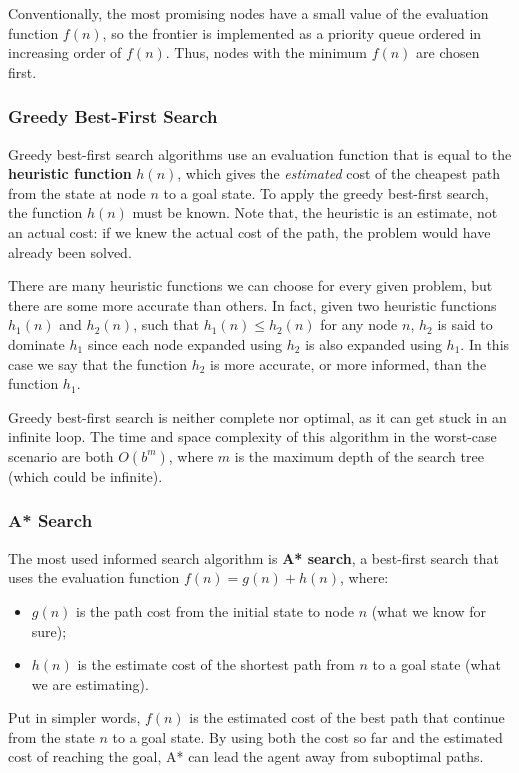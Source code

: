 \documentclass{article}
\begin{document}
Conventionally, the most promising nodes have a small value of the evaluation function \(f(n)\), so the frontier is implemented as a priority queue ordered in increasing order of \(f(n)\). Thus, nodes with the minimum \(f(n)\) are chosen first.

\subsubsection{Greedy Best-First Search}
Greedy best-first search algorithms use an evaluation function that is equal to the \textbf{heuristic function} \(h(n)\), which gives the \textit{estimated} cost of the cheapest path from the state at node \(n\) to a goal state. To apply the greedy best-first search, the function \(h(n)\) must be known. Note that, the heuristic is an estimate, not an actual cost: if we knew the actual cost of the path, the problem would have already been solved.

There are many heuristic functions we can choose for every given problem, but there are some more accurate than others. In fact, given two heuristic functions \(h_1(n)\) and \(h_2(n)\), such that \(h_1(n)\le h_2(n)\) for any node \(n\), \(h_2\) is said to dominate \(h_1\) since each node expanded using \(h_2\) is also expanded using \(h_1\). In this case we say that the function \(h_2\) is more accurate, or more informed, than the function \(h_1\).

Greedy best-first search is neither complete nor optimal, as it can get stuck in an infinite loop. The time and space complexity of this algorithm in the worst-case scenario are both \(O(b^m)\), where \(m\) is the maximum depth of the search tree (which could be infinite).

\subsubsection{A* Search}
The most used informed search algorithm is \textbf{A* search}, a best-first search that uses the evaluation function \(f(n) = g(n) + h(n)\), where:
\begin{itemize}
    \item \(g(n)\) is the path cost from the initial state to node \(n\) (what we know for sure);
    \item \(h(n)\) is the estimate cost of the shortest path from \(n\) to a goal state (what we are estimating).
\end{itemize}
Put in simpler words, \(f(n)\) is the estimated cost of the best path that continue from the state \(n\) to a goal state. By using both the cost so far and the estimated cost of reaching the goal, A* can lead the agent away from suboptimal paths.
\end{document}
